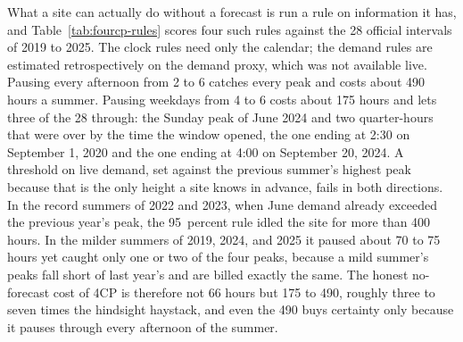 What a site can actually do without a forecast is run a rule on information it has, and Table~\ref{tab:fourcp-rules} scores four such rules against the 28 official intervals of 2019 to 2025. The clock rules need only the calendar; the demand rules are estimated retrospectively on the demand proxy, which was not available live. %
Pausing every afternoon from 2 to 6 catches every peak and costs about 490 hours a summer. Pausing weekdays from 4 to 6 costs about 175 hours and lets three of the 28 through: the Sunday peak of June 2024 and two quarter-hours that were over by the time the window opened, the one ending at 2:30 on September 1, 2020 and the one ending at 4:00 on September 20, 2024. %
A threshold on live demand, set against the previous summer's highest peak because that is the only height a site knows in advance, fails in both directions. In the record summers of 2022 and 2023, when June demand already exceeded the previous year's peak, the 95~percent rule idled the site for more than 400 hours. In the milder summers of 2019, 2024, and 2025 it paused about 70 to 75 hours yet caught only one or two of the four peaks, because a mild summer's peaks fall short of last year's and are billed exactly the same. %
The honest no-forecast cost of 4CP is therefore not 66 hours but 175 to 490, roughly three to seven times the hindsight haystack, and even the 490 buys certainty only because it pauses through every afternoon of the summer. %

